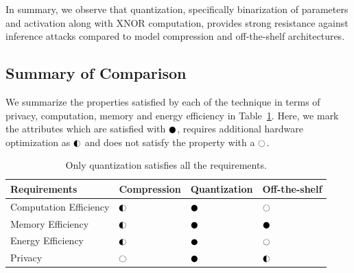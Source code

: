 In summary, we observe that quantization, specifically binarization of parameters and activation along with XNOR computation, provides strong resistance against inference attacks compared to model compression and off-the-shelf architectures.




\subsection{Summary of Comparison}
\label{eval-summary}

We summarize the properties satisfied by each of the technique in terms of privacy, computation, memory and energy efficiency in Table~\ref{tbl:comparison}.
Here, we mark the attributes which are satisfied with $\cmark$, requires additional hardware optimization as $\smark$ and does not satisfy the property with a $\xmark$.

\begin{table}[!htb]
\begin{center}
\renewcommand\arraystretch{1.5}
\fontsize{6.7pt}{6.7pt}\selectfont
\begin{tabular}{|l||l|l|l|}
\hline
Requirements & Compression & Quantization & Off-the-shelf  \\
\hline
Computation Efficiency & $\smark$  & $\cmark$   & $\xmark$ \\
\hline
Memory Efficiency &  $\smark$ & $\cmark$   & $\cmark$ \\
\hline
Energy Efficiency &  $\smark$   & $\cmark$   & $\xmark$ \\
\hline
Privacy &  $\xmark$   & $\cmark$   & $\smark$ \\
\hline
\end{tabular}
\end{center}
\caption{Only quantization satisfies all the requirements.}
\label{tbl:comparison}
\end{table}

